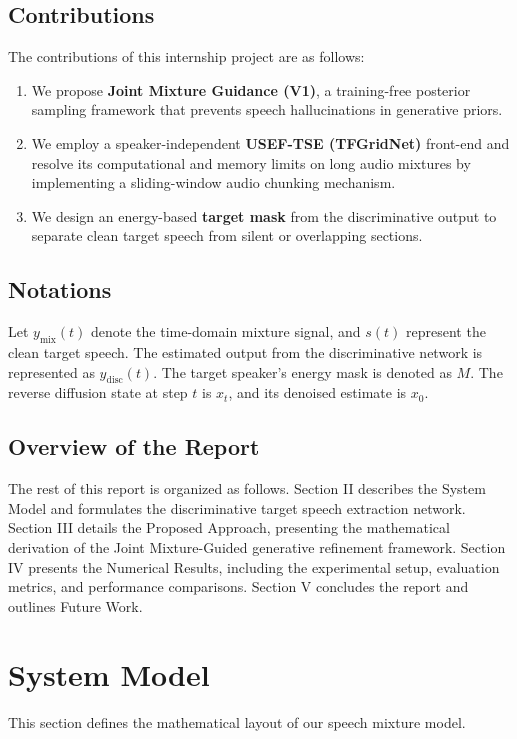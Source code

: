 \documentclass[conference]{IEEEtran}
\begin{document}
\subsection{Contributions}
The contributions of this internship project are as follows:
\begin{enumerate}
    \item We propose \textbf{Joint Mixture Guidance (V1)}, a training-free posterior sampling framework that prevents speech hallucinations in generative priors.
    \item We employ a speaker-independent \textbf{USEF-TSE\cite{b6} (TFGridNet)} front-end and resolve its computational and memory limits on long audio mixtures by implementing a sliding-window audio chunking mechanism.
    \item We design an energy-based \textbf{target mask} from the discriminative output to separate clean target speech from silent or overlapping sections.
\end{enumerate}

\subsection{Notations}
Let $y_{\text{mix}}(t)$ denote the time-domain mixture signal, and $s(t)$ represent the clean target speech. The estimated output from the discriminative network is represented as $y_{\text{disc}}(t)$. The target speaker's energy mask is denoted as $M$. The reverse diffusion state at step $t$ is $x_t$, and its denoised estimate is $x_0$.

\subsection{Overview of the Report}
The rest of this report is organized as follows. Section II describes the System Model and formulates the discriminative target speech extraction network. Section III details the Proposed Approach, presenting the mathematical derivation of the Joint Mixture-Guided generative refinement framework. Section IV presents the Numerical Results, including the experimental setup, evaluation metrics, and performance comparisons. Section V concludes the report and outlines Future Work.

\section{System Model}
This section defines the mathematical layout of our speech mixture model.
\end{document}

